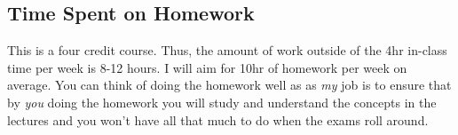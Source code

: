 \subsection*{Time Spent on Homework }

This is a four credit course. Thus, the amount of work outside of the 4hr in-class time per week is 8-12 hours. I will aim for 10hr of homework per week on average. You can think of doing the homework well as  as \emph{my} job is to ensure that by \emph{you} doing the homework you will study and understand the concepts in the lectures and you won't have all that much to do when the exams roll around.
